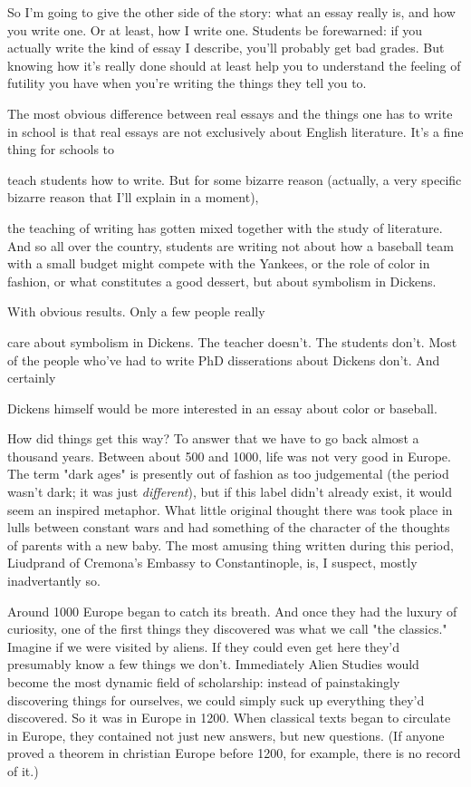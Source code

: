 So I'm going to give the other side of the story: what
an essay really is, and how you write one.  Or at least,
how I write one.  Students be forewarned: if you actually write
the kind of essay I describe, you'll probably get bad
grades.  But knowing how it's really done should
at least help you to understand the feeling of futility
you have when you're writing the things they tell you to.


The most obvious difference between real essays and
the things one has to write in school is that real
essays are not exclusively about English literature.
It's a fine thing for schools to

teach students how to
write.  But for some bizarre reason (actually, a very specific bizarre
reason that I'll explain in a moment),

the teaching of
writing has gotten mixed together with the study
of literature.  And so all over the country, students are
writing not about how a baseball team with a small budget 
might compete with the Yankees, or the role of color in
fashion, or what constitutes a good dessert, but about
symbolism in Dickens.

With obvious 
results.  Only a few people really

care about
symbolism in Dickens.  The teacher doesn't.
The students don't.  Most of the people who've had to write PhD
disserations about Dickens don't.  And certainly

Dickens himself would be more interested in an essay
about color or baseball.

How did things get this way?  To answer that we have to go back
almost a thousand years.  Between about 500 and 1000, life was
not very good in Europe.  The term "dark ages" is presently
out of fashion as too judgemental (the period wasn't dark; 
it was just \emph{different}), but if this label didn't already
exist, it would seem an inspired metaphor.  What little
original thought there was took place in lulls between
constant wars and had something of the character of
the thoughts of parents with a new baby.
The most amusing thing written during this
period, Liudprand of Cremona's Embassy to Constantinople, is,
I suspect, mostly inadvertantly so.

Around 1000 Europe began to catch its breath.
And once they
had the luxury of curiosity, one of the first things they discovered
was what we call "the classics."
Imagine if we were visited  
by aliens.  If they could even get here they'd presumably know a
few things we don't.  Immediately Alien Studies would become
the most dynamic field of scholarship: instead of painstakingly
discovering things for ourselves, we could simply suck up
everything they'd discovered.  So it was in Europe in 1200.
When classical texts began to circulate in Europe, they contained
not just new answers, but new questions.  (If anyone proved
a theorem in christian Europe before 1200, for example, there
is no record of it.)

